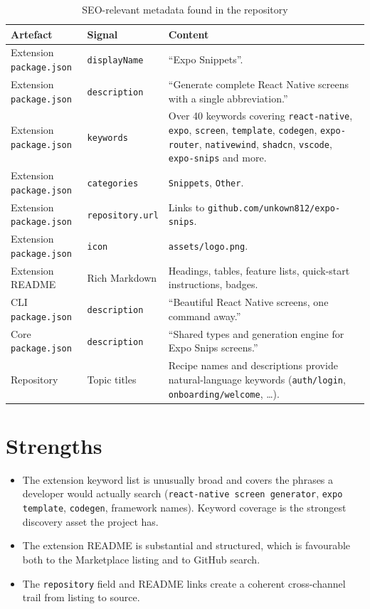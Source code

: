 \begin{longtable}{p{3.6cm}p{3.2cm}p{7.4cm}}
\caption{SEO-relevant metadata found in the repository}\\
\toprule
\textbf{Artefact} & \textbf{Signal} & \textbf{Content} \\
\midrule

Extension \texttt{package.json} & \texttt{displayName} & ``Expo Snippets''. \\
Extension \texttt{package.json} & \texttt{description} & ``Generate complete React
Native screens with a single abbreviation.'' \\
Extension \texttt{package.json} & \texttt{keywords} & Over 40 keywords covering
\texttt{react-native}, \texttt{expo}, \texttt{screen}, \texttt{template},
\texttt{codegen}, \texttt{expo-router}, \texttt{nativewind}, \texttt{shadcn},
\texttt{vscode}, \texttt{expo-snips} and more. \\
Extension \texttt{package.json} & \texttt{categories} & \texttt{Snippets},
\texttt{Other}. \\
Extension \texttt{package.json} & \texttt{repository.url} & Links to
\texttt{github.com/unkown812/expo-snips}. \\
Extension \texttt{package.json} & \texttt{icon} & \texttt{assets/logo.png}. \\
Extension README & Rich Markdown & Headings, tables, feature lists, quick-start
instructions, badges. \\
CLI \texttt{package.json} & \texttt{description} & ``Beautiful React Native
screens, one command away.'' \\
Core \texttt{package.json} & \texttt{description} & ``Shared types and generation
engine for Expo Snips screens.'' \\
Repository & Topic titles & Recipe names and descriptions provide natural-language
keywords (\texttt{auth/login}, \texttt{onboarding/welcome}, \dots). \\
\bottomrule
\end{longtable}

\section{Strengths}

\begin{itemize}
  \item The extension keyword list is unusually broad and covers the phrases a
        developer would actually search (\texttt{react-native screen generator},
        \texttt{expo template}, \texttt{codegen}, framework names). Keyword
        coverage is the strongest discovery asset the project has.
  \item The extension README is substantial and structured, which is favourable
        both to the Marketplace listing and to GitHub search.
  \item The \texttt{repository} field and README links create a coherent
        cross-channel trail from listing to source.
\end{itemize}


